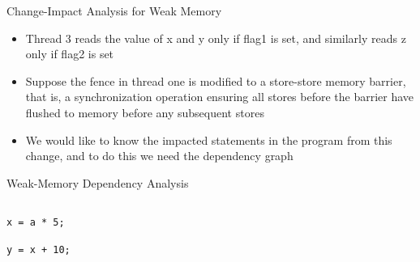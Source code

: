 \documentclass[t]{beamer}
\begin{document}
\begin{frame}[fragile]{Change-Impact Analysis for Weak Memory}
{\begin{itemize}
      \item Thread 3 reads the value of x and y only if flag1 is set, and
        similarly reads z only if flag2 is set
      \item Suppose the fence in thread one is modified to a store-store memory
        barrier, that is, a synchronization operation ensuring all stores
        before the barrier have flushed to memory before any subsequent
        stores
      \item We would like to know the impacted statements in the program from
        this change, and to do this we need the dependency graph
    \end{itemize}
  }
\end{frame}

\begin{frame}[c]{Weak-Memory Dependency Analysis}
  \begin{columns}[c]
    \begin{column}{0.5\textwidth}
        \Huge
        \texttt{\textcolor{matred400}{x} = a * 5;}

        \pause

        \texttt{y = \textcolor{matred400}{x} + 10;}



\end{column}
\end{columns}
\end{frame}
\end{document}
